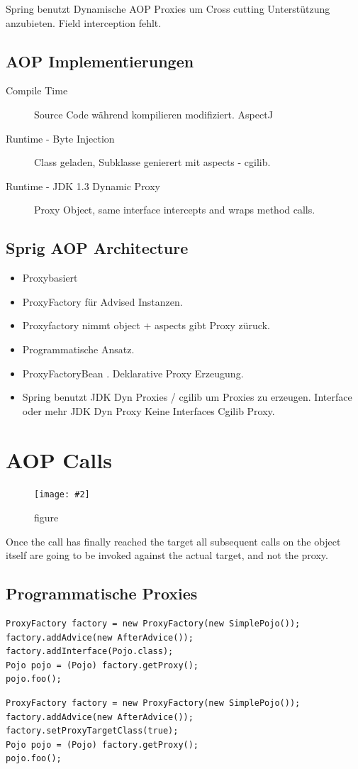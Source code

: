 \documentclass[a4paper,10pt]{scrreprt}
\newcommand{\pic}[2][figure]{\begin{figure}[h]
 \centering
 \texttt{[image: \#2]}
 \caption{#1}
\end{figure}
}
\begin{document}
Spring benutzt Dynamische AOP Proxies um Cross cutting Unterstützung anzubieten. Field interception fehlt.

\subsection{AOP Implementierungen}
\begin{description}
 \item [Compile Time] Source Code während kompilieren modifiziert. AspectJ
 \item [Runtime - Byte Injection] Class geladen, Subklasse genierert mit aspects - cgilib.
 \item [Runtime - JDK 1.3 Dynamic Proxy] Proxy Object, same interface intercepts and wraps method calls.
\end{description}

\subsection{Sprig AOP Architecture}
\begin{itemize}
 \item Proxybasiert
 \item ProxyFactory für Advised Instanzen.
  \item Proxyfactory nimmt object + aspects gibt Proxy züruck.
  \item Programmatische Ansatz.
  \item ProxyFactoryBean . Deklarative Proxy Erzeugung.
  \item Spring benutzt JDK Dyn Proxies / cgilib um Proxies zu erzeugen.
   Interface oder mehr JDK Dyn Proxy
  \subitem Keine Interfaces Cgilib Proxy.
\end{itemize}

\section{AOP Calls}
\pic{aopcall.png}
\begin{framed}
Once the call has finally reached the target all subsequent
calls on the object itself are going to be invoked against
the actual target, and not the proxy.
\end{framed}

\subsection{Programmatische Proxies}
\begin{lstlisting}[caption=JDKProxy]
 ProxyFactory factory = new ProxyFactory(new SimplePojo());
factory.addAdvice(new AfterAdvice());
factory.addInterface(Pojo.class);
Pojo pojo = (Pojo) factory.getProxy();
pojo.foo();
\end{lstlisting}
\begin{lstlisting}[caption=CGIlib Proxy]
 ProxyFactory factory = new ProxyFactory(new SimplePojo());
factory.addAdvice(new AfterAdvice());
factory.setProxyTargetClass(true);
Pojo pojo = (Pojo) factory.getProxy();
pojo.foo();
\end{lstlisting}
\end{document}
